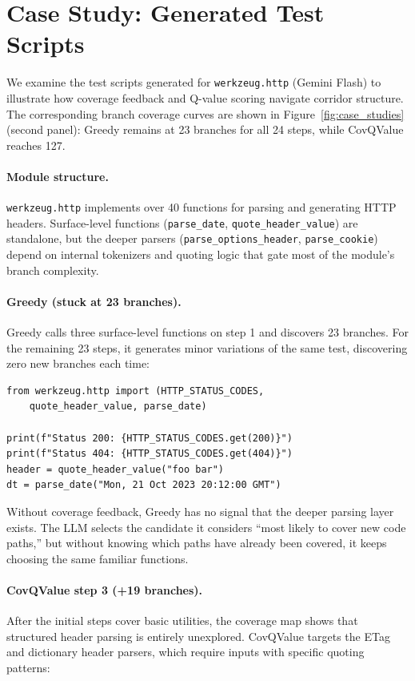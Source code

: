 \section{Case Study: Generated Test Scripts}
\label{app:case_study_scripts}

We examine the test scripts generated for \texttt{werkzeug.http} (Gemini Flash) to illustrate how coverage feedback and Q-value scoring navigate corridor structure. The corresponding branch coverage curves are shown in Figure~\ref{fig:case_studies} (second panel): Greedy remains at 23 branches for all 24 steps, while CovQValue reaches 127.

\paragraph{Module structure.} \texttt{werkzeug.http} implements over 40 functions for parsing and generating HTTP headers. Surface-level functions (\texttt{parse\_date}, \texttt{quote\_header\_value}) are standalone, but the deeper parsers (\texttt{parse\_options\_header}, \texttt{parse\_cookie}) depend on internal tokenizers and quoting logic that gate most of the module's branch complexity.

\paragraph{Greedy (stuck at 23 branches).} Greedy calls three surface-level functions on step 1 and discovers 23 branches. For the remaining 23 steps, it generates minor variations of the same test, discovering zero new branches each time:

\begin{small}
\begin{verbatim}
from werkzeug.http import (HTTP_STATUS_CODES,
    quote_header_value, parse_date)

print(f"Status 200: {HTTP_STATUS_CODES.get(200)}")
print(f"Status 404: {HTTP_STATUS_CODES.get(404)}")
header = quote_header_value("foo bar")
dt = parse_date("Mon, 21 Oct 2023 20:12:00 GMT")
\end{verbatim}
\end{small}

Without coverage feedback, Greedy has no signal that the deeper parsing layer exists. The LLM selects the candidate it considers ``most likely to cover new code paths,'' but without knowing which paths have already been covered, it keeps choosing the same familiar functions.

\paragraph{CovQValue step 3 (+19 branches).} After the initial steps cover basic utilities, the coverage map shows that structured header parsing is entirely unexplored. CovQValue targets the ETag and dictionary header parsers, which require inputs with specific quoting patterns:

